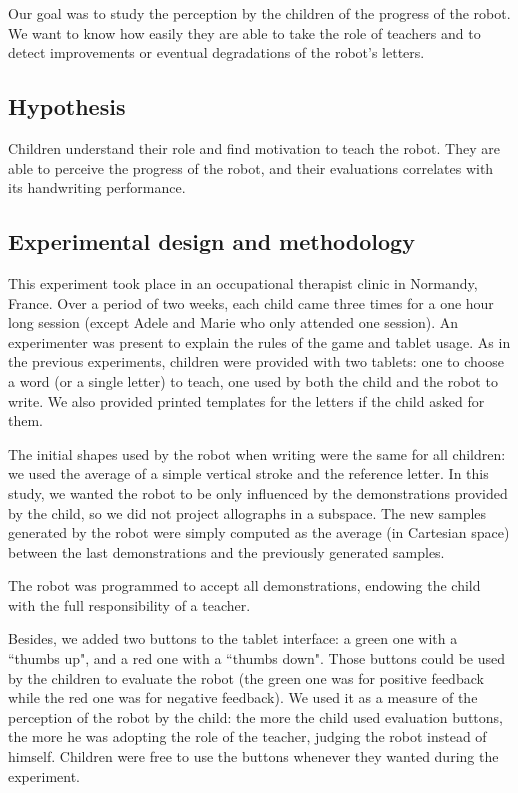 \documentclass[conference]{IEEEtran}
\begin{document}
Our goal was to study the perception by the children of the progress of the robot. We want to know how easily they are able to take the role of teachers and to detect improvements or eventual degradations of the robot's letters. 


\subsection{Hypothesis}

Children understand their role and find motivation to teach the robot. They are able to perceive the progress of the robot, and their evaluations correlates with its handwriting performance.

\subsection{Experimental design and methodology}

This experiment took place in an occupational therapist clinic
in Normandy, France. Over a period of two weeks, each child came three times for a one hour long
session (except Adele and Marie who only attended one session). An experimenter was present to explain the rules of the game and tablet usage. As in the previous experiments, children were provided with two tablets: one to choose a word (or a single letter) to teach, one
used by both the child and the robot to write. We also provided printed templates for the letters if the child asked for them. 

The initial shapes used by the robot when writing were the same for all children: we
used the average of a simple vertical stroke and the reference letter. In this study,
we wanted the robot to be only influenced by the demonstrations provided by the
child, so we did not project allographs in a subspace. The new 
samples generated by the robot were simply computed as the average (in Cartesian space) between the last demonstrations and
the previously generated samples.

The robot was programmed to accept all demonstrations, endowing the child with the
full responsibility of a teacher.

Besides, we added two buttons to the tablet interface: a green one with a ``thumbs up", and
a red one with a ``thumbs down". Those buttons could be used by the children to evaluate the
robot (the green one was for positive feedback while the red one was for negative feedback). 
We used it as a measure of the perception of the robot by the child: the more the
child used evaluation buttons, the more he was adopting the role of the teacher, judging the
robot instead of himself. Children were free to use the buttons whenever they wanted during the experiment. 
\end{document}
